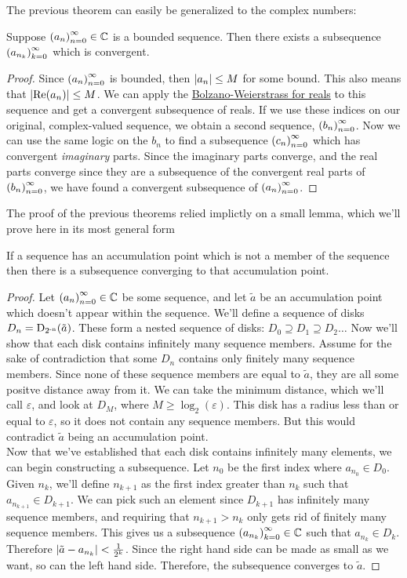 The previous theorem can easily be generalized to the complex numbers:
\begin{theorem}
Suppose $\seq{a} \in \mathbb{C}$ is a bounded sequence. Then there exists a subsequence $\seq{a}[n_k][k]$ which is convergent. 
\end{theorem}
\begin{proof}
Since $\seq{a}$ is bounded, then $\modulus{a_n} \leq M$ for some bound. This also means that $\modulus{\rpart{a_n}} \leq M$. We can apply the \hyperlink{Bolzano-Weierstrass Theorem, Real-Valued Case}{Bolzano-Weierstrass for reals} to this sequence and get a convergent subsequence of reals. If we use these indices on our original, complex-valued sequence, we obtain a second sequence, $\seq{b}$. Now we can use the same logic on the $b_n$ to find a subsequence $\seq{c}$ which has convergent \emph{imaginary} parts. Since the imaginary parts converge, and the real parts converge since they are a subsequence of the convergent real parts of $\seq{b}$, we have found a convergent subsequence of $\seq{a}$.
\end{proof}
The proof of the previous theorems relied implictly on a small lemma, which we'll prove here in its most general form
\begin{lemma}
If a sequence has an accumulation point which is not a member of the sequence then there is a subsequence converging to that accumulation point.
\end{lemma}
\begin{proof}
Let $\seq{a} \in \mathbb{C}$ be some sequence, and let $\tilde{a}$ be an accumulation point which doesn't appear within the sequence. We'll define a sequence of disks $D_n = \disk{\tilde{a}}{2^{-n}}$. These form a nested sequence of disks: $D_0 \supseteq D_1 \supseteq D_2 \ldots$ Now we'll show that each disk contains infinitely many sequence members. Assume for the sake of contradiction that some $D_n$ contains only finitely many sequence members. Since none of these sequence members are equal to $\tilde{a}$, they are all some positve distance away from it. We can take the minimum distance, which we'll call $\varepsilon$, and look at $D_M$, where $M \geq \log_2 (\varepsilon)$. This disk has a radius less than or equal to $\varepsilon$, so it does not contain any sequence members. But this would contradict $\tilde{a}$ being an accumulation point.\\
Now that we've established that each disk contains infinitely many elements, we can begin constructing a subsequence. Let $n_0$ be the first index where $a_{n_0} \in D_0$. Given $n_k$, we'll define $n_{k+1}$ as the first index greater than $n_k$ such that $a_{n_{k+1}} \in D_{k+1}$. We can pick such an element since $D_{k+1}$ has infinitely many sequence members, and requiring that $n_{k+1} > n_k$ only gets rid of finitely many sequence members. This gives us a subsequence $\seq{a}[n_k][k] \in \mathbb{C}$ such that $a_{n_k} \in D_k$. Therefore $\modulus{\tilde{a}-a_{n_k}} < \frac{1}{2^k}$. Since the right hand side can be made as small as we want, so can the left hand side. Therefore, the subsequence converges to $\tilde{a}$. 
\end{proof}
